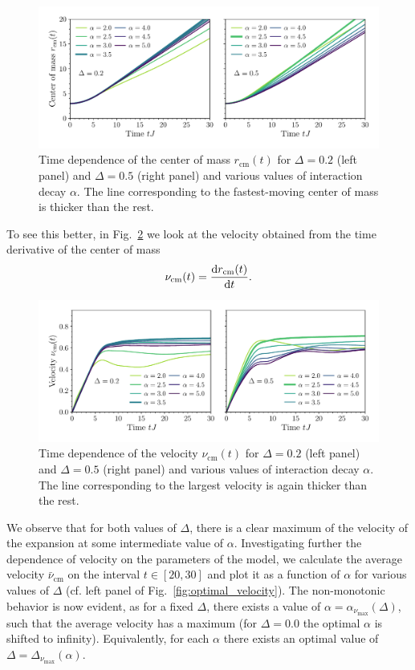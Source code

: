 \begin{figure}[htbp]
  \centering
  \includegraphics[width=0.9\linewidth]{Figures/center_of_mass.pdf}
  \caption{Time dependence of the center of mass \(r_{\text{cm}}(t)\) for \(\Delta = 0.2\) (left panel) and \(\Delta = 0.5\)
    (right panel) and various values of interaction decay \(\alpha\). The line corresponding to the fastest-moving center of mass
    is thicker than the rest.}
  \label{fig:center_of_mass}
\end{figure}

To see this better, in Fig.~\ref{fig:velocity} we look at the velocity
obtained from the time derivative of the center of mass
\begin{equation}
  {\nu}_{\text{cm}}(t) = \dv{r_{\text{cm}}(t)}{t}.
  \label{eq:velocity}
\end{equation}
\begin{figure}[htbp]
  \centering
  \includegraphics[width=0.9\linewidth]{Figures/velocity.pdf}
  \caption{Time dependence of the velocity \(\nu_{\text{cm}}(t)\) for \(\Delta = 0.2\) (left panel) and \(\Delta = 0.5\)
    (right panel) and various values of interaction decay \(\alpha\). The line corresponding to the largest velocity
    is again thicker than the rest.}
  \label{fig:velocity}
\end{figure}
We observe that for both values of \(\Delta\), there is a clear maximum of the velocity of the expansion
at some intermediate value of \(\alpha\). Investigating further the dependence of velocity on the parameters
of the model, we calculate the average velocity \(\bar{\nu}_{\text{cm}}\) on the interval \(t\in\left[20,30\right]\)
and plot it as a function of \(\alpha\) for various values of \(\Delta\)
(cf. left panel of Fig.~\ref{fig:optimal_velocity}).
The non-monotonic behavior is now evident, as for a fixed \(\Delta\), there exists a value of
\( \alpha = \alpha_{\nu_{\mathrm{max}}}(\Delta) \),
such that the average velocity has a maximum (for \(\Delta = 0.0\) the optimal \(\alpha\) is shifted to infinity).
Equivalently, for each \(\alpha\) there exists an optimal value of \(\Delta = \Delta_{\nu_{\mathrm{max}}} (\alpha)\).

